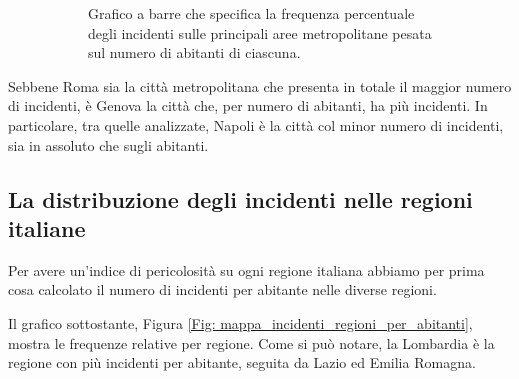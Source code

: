 \documentclass[12pt,a4paper,final,oneside]{article}			%
\begin{document}
\begin{figure}[h!]
\begin{subfigure}{0.48\textwidth}
                \caption{Grafico a barre che specifica la frequenza percentuale degli incidenti sulle principali aree metropolitane pesata sul numero di abitanti di ciascuna. }
                \label{Fig: citta_metropolitane_per_abitanti}
            \end{subfigure}
            \caption{}
        \end{figure}
        
        Sebbene Roma sia la città metropolitana che presenta in totale il maggior numero di incidenti, è Genova la città che, per numero di abitanti, ha più incidenti. In particolare, tra quelle analizzate, Napoli è la città col minor numero di incidenti, sia in assoluto che sugli abitanti.
        
    \subsection{La distribuzione degli incidenti nelle regioni italiane}
    
        Per avere un’indice di pericolosità su ogni regione italiana abbiamo per prima cosa calcolato il numero di incidenti per abitante nelle diverse regioni. 
        
        Il grafico sottostante, Figura \ref{Fig: mappa_incidenti_regioni_per_abitanti}, mostra le frequenze relative per regione. Come si può notare, la Lombardia è la regione con più incidenti per abitante, seguita da Lazio ed Emilia Romagna.
        
\end{document}
